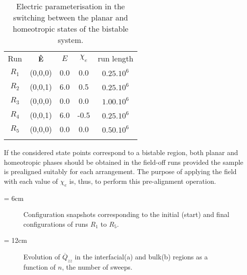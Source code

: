 \begin{table}
\centering
\begin{tabular}{||c||c||c||c||c||}
	\hhline{|t:=:t:=:t:=:t:=:t:=:t|}
	Run		&	$\mathbf{\hat{E} }$	&$E$	& $\chi_e$	&run length\\
	\hhline{|:=::=::=::=::=:|}
	$R_1$	&	(0,0,0)		&0.0	&0.0	&$0.25.10^6$\\
	$R_2$	&	(0,0,1)		&6.0	&0.5	&$0.25.10^6$\\
	$R_3$	&	(0,0,0)		&0.0	&0.0	&$1.00.10^6$\\
	$R_4$	&	(0,0,1)		&6.0	&-0.5	&$0.25.10^6$\\
	$R_5$	&	(0,0,0)		&0.0	&0.0	&$0.50.10^6$\\
	\hhline{|b:=:b:=:b:=:b:=:b:=:b|}
\end{tabular}
\caption{Electric parameterisation in the switching between the planar and
homeotropic states of the bistable system.}
\label{tble:bistFieldConditions}
\end{table}

If the considered state points correspond to a bistable region, both planar and homeotropic phases
should be obtained in the field-off runs provided the sample is prealigned suitably for each
arrangement. The purpose of applying the field with each value of $\chi_e$ is, thus, to perform 
this pre-alignment operation.


\picW = 6cm
\begin{figure}
	\centering
	\caption{Configuration snapshots corresponding to the initial (start) and final
	configurations of runs $R_1$ to $R_5$.}
	\label{fig:HGOk3BistSnaps}
\end{figure}


\picW = 12cm
\begin{figure}
	\centering
	\caption{Evolution of $\overline{Q}_{zz}$ in the interfacial(a) and bulk(b) regions as a
	function of $n$, the number of sweeps.}
	\label{fig:QzzWak3Bist}
\end{figure}

